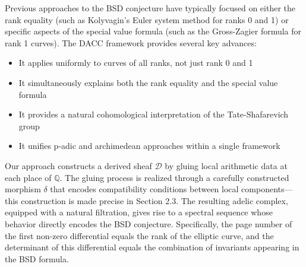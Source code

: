 \documentclass{article}
\theoremstyle{plain}
\theoremstyle{definition}
\theoremstyle{remark}
\begin{document}
Previous approaches to the BSD conjecture have typically focused on either the rank equality (such as Kolyvagin's Euler system method for ranks 0 and 1) or specific aspects of the special value formula (such as the Gross-Zagier formula for rank 1 curves). The DACC framework provides several key advances:

\begin{itemize}
\item It applies uniformly to curves of all ranks, not just rank 0 and 1
\item It simultaneously explains both the rank equality and the special value formula
\item It provides a natural cohomological interpretation of the Tate-Shafarevich group
\item It unifies p-adic and archimedean approaches within a single framework
\end{itemize}

Our approach constructs a derived sheaf $\mathcal{D}$ by gluing local arithmetic data at each place of $\mathbb{Q}$. The gluing process is realized through a carefully constructed morphism $\delta$ that encodes compatibility conditions between local components—this construction is made precise in Section 2.3. The resulting adelic complex, equipped with a natural filtration, gives rise to a spectral sequence whose behavior directly encodes the BSD conjecture. Specifically, the page number of the first non-zero differential equals the rank of the elliptic curve, and the determinant of this differential equals the combination of invariants appearing in the BSD formula.
\end{document}
